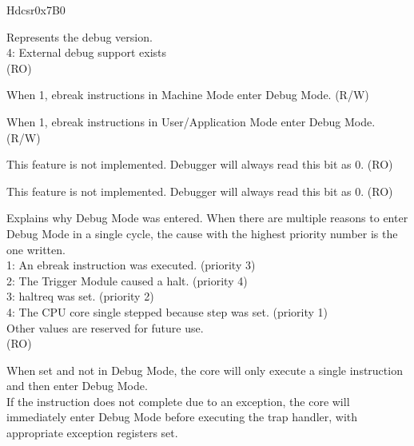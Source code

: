 
\begin{register}{H}{dcsr}{0x7B0}
\label{regdesc:DCSR}
%
%
%
%
%
%
%
%
%
%
%
%
\regnewline%
\begin{regdesc}
\begin{reglist}
\label{fielddesc:DCSRXEDBGVER}\item [xdebugver] Represents the debug version. \\
4: External debug support exists\\
(RO)
\label{fielddesc:DCSREBREAKM}\item [ebreakm] When 1, ebreak instructions in Machine Mode enter Debug Mode. (R/W)
\label{fielddesc:DCSREBREAKU}\item [ebreaku] When 1, ebreak instructions in User/Application Mode enter Debug Mode. (R/W)
\label{fielddesc:DCSRSTOPCOUNT}\item [stopcount] This feature is not implemented. Debugger will always read this bit as 0. (RO)
\label{fielddesc:DCSRSTOPTIME}\item [stoptime] This feature is not implemented. Debugger will always read this bit as 0. (RO)
\label{fielddesc:DCSRCAUSE}\item [cause] Explains why Debug Mode was entered. When there are multiple reasons to enter Debug Mode in a single cycle, the cause with the highest priority number is the one written.\\
1: An ebreak instruction was executed. (priority 3)\\
2: The Trigger Module caused a halt. (priority 4)\\
3: haltreq was set. (priority 2)\\
4: The CPU core single stepped because step was set. (priority 1)\\
Other values are reserved for future use.\\
(RO)
\label{fielddesc:DCSRSTEP}\item [step] When set and not in Debug Mode, the core will only execute a single instruction and then enter Debug Mode. \\
If the instruction does not complete due to an exception, the core will immediately enter Debug Mode before executing the trap handler, with appropriate exception registers set.\\

\end{reglist}
\end{regdesc}
\end{register}
